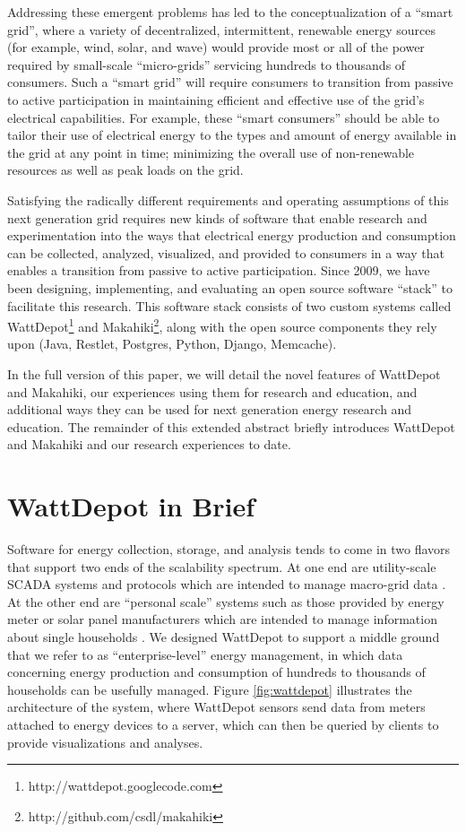 \documentclass{acm_proc_article-sp}
\begin{document}
Addressing these emergent problems has led to the conceptualization of a ``smart grid'',
where a variety of decentralized, intermittent, renewable energy sources (for example,
wind, solar, and wave) would provide most or all of the power required by small-scale
``micro-grids'' servicing hundreds to thousands of consumers. Such a ``smart
grid'' will require consumers to transition from passive to active participation in
maintaining efficient and effective use of the grid's electrical capabilities.  For
example, these ``smart consumers'' should be able to tailor their use of electrical energy
to the types and amount of energy available in the grid at any point in time; minimizing
the overall use of non-renewable resources as well as peak loads on the grid.

Satisfying the radically different requirements and operating assumptions of this next
generation grid requires new kinds of software that enable research and experimentation
into the ways that electrical energy production and consumption can be collected,
analyzed, visualized, and provided to consumers in a way that enables a transition from
passive to active participation.  Since 2009, we have been designing, implementing, and
evaluating an open source software ``stack'' to facilitate this research.  This software
stack consists of two custom systems called
WattDepot\footnote{http://wattdepot.googlecode.com} and
Makahiki\footnote{http://github.com/csdl/makahiki}, along with the open source components
they rely upon (Java, Restlet, Postgres, Python, Django, Memcache).

In the full version of this paper, we will detail the novel features of WattDepot and
Makahiki, our experiences using them for research and education, and additional ways they
can be used for next generation energy research and
education.  The remainder of this extended abstract briefly introduces WattDepot and
Makahiki and our research experiences to date.

\section{WattDepot in Brief}

Software for energy collection, storage, and analysis tends to come in two flavors that
support two ends of the scalability spectrum.  At one end are utility-scale SCADA systems
and protocols which are intended to manage macro-grid data
\cite{SmartEnergy2.0,OSHAN,OpenPDC}.  At the other end are ``personal scale'' systems such
as those provided by energy meter or solar panel manufacturers which are intended to
manage information about single households \cite{TED,EMS100}.  We designed WattDepot to
support a middle ground that we refer to as ``enterprise-level'' energy management, in
which data concerning energy production and consumption of hundreds to thousands of
households can be usefully managed.  Figure \ref{fig:wattdepot} illustrates the
architecture of the system, where WattDepot sensors send data from meters attached to
energy devices to a server, which can then be queried by clients to provide visualizations
and analyses.
\end{document}
